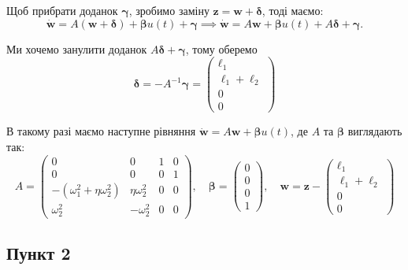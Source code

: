 \documentclass{hw_template}
\begin{document}
Щоб прибрати доданок $\boldsymbol{\gamma}$, зробимо заміну $\boldsymbol{z} = \boldsymbol{w} + \boldsymbol{\delta}$, тоді маємо:
\begin{equation*}
    \dot{\boldsymbol{w}} = A(\boldsymbol{w} + \boldsymbol{\delta}) + \boldsymbol{\beta}u(t) + \boldsymbol{\gamma} \implies \dot{\boldsymbol{w}} = A\boldsymbol{w} + \boldsymbol{\beta}u(t) + A\boldsymbol{\delta} + \boldsymbol{\gamma}.
\end{equation*}

Ми хочемо занулити доданок $A\boldsymbol{\delta} + \boldsymbol{\gamma}$, тому оберемо
\begin{equation*}
    \boldsymbol{\delta} = -A^{-1}\boldsymbol{\gamma} = \begin{pmatrix}
        \ell_1 \\ \ell_1+\ell_2 \\ 0 \\ 0
    \end{pmatrix}
\end{equation*}

В такому разі маємо наступне рівняння $\dot{\boldsymbol{w}} = A\boldsymbol{w} + \boldsymbol{\beta}u(t)$, де $A$ та $\boldsymbol{\beta}$ виглядають так:
\begin{equation*}
    A = \begin{pmatrix}
        0 & 0 & 1 & 0 \\
        0 & 0 & 0 & 1 \\
        -(\omega_1^2 + \eta\omega_2^2) & \eta\omega_2^2 & 0 & 0 \\
        \omega_2^2 & -\omega_2^2 & 0 & 0
    \end{pmatrix}, \quad
    \boldsymbol{\beta} = \begin{pmatrix}
        0 \\ 0 \\ 0 \\ 1
    \end{pmatrix}, \quad
    \boldsymbol{w} = \boldsymbol{z} - \begin{pmatrix}
        \ell_1 \\ \ell_1+\ell_2 \\ 0 \\ 0
    \end{pmatrix}
\end{equation*}
\pagebreak

\subsection{Пункт 2}
\end{document}
